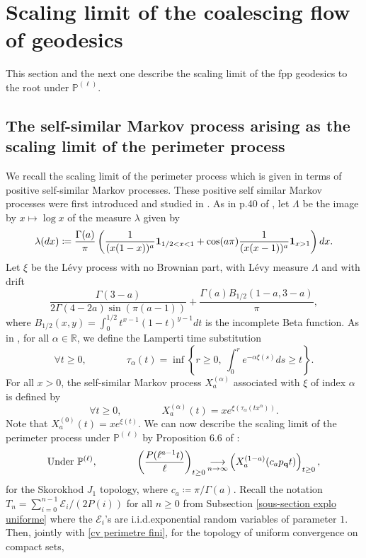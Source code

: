 \documentclass[11pt]{article}
\numberwithin{equation}{section}
\def \R{\mathbb {R}}
\def\P{\mathbb{P}}
\begin{document}
\section{Scaling limit of the coalescing flow of geodesics}\label{section flot}
This section and the next one describe the scaling limit of the fpp geodesics to the root under $\P^{(\ell)}$. 
\subsection{The self-similar Markov process arising as the scaling limit of the perimeter process}\label{sous-section processus autosimilaire}
We recall the scaling limit of the perimeter process which is given in terms of positive self-similar Markov processes. These positive self similar Markov processes were first introduced and studied in \cite{BBCK}. As in p.\@ 40 of \cite{BBCK}, let $\Lambda$ be the image by $x \mapsto \log x$ of the measure {$\lambda$ given by}
$$
\lambda (dx) \coloneqq \frac{\Gamma(a)}{\pi} \left( 
\frac{1}{(x(1-x))^a} {\bf 1}_{1/2 < x < 1} + \cos(a \pi) \frac{1}{(x(x-1))^a} {\bf 1}_{x>1} \right) dx.
$$
Let $\xi$ be the L\'evy process with no Brownian part, with L\'evy measure $\Lambda$ and with drift
\begin{equation}\label{eq drift}
\frac{\Gamma(3-a)}{2\Gamma(4-2a) \sin (\pi (a-1))} + \frac{\Gamma(a)B_{1/2}(1-a, 3-a)}{\pi},
\end{equation}
where $B_{1/2}(x,y) = \int_0^{1/2} t^{x-1} (1-t)^{y-1} dt$ is the incomplete Beta function. As in \cite{BBCK}, for all $\alpha \in \R$, we define the Lamperti time substitution
$$\forall t \ge 0, \qquad \qquad
\tau_\alpha(t) = \inf \left\{ r \ge 0, \ \int_0^r e^{-\alpha \xi(s)} ds \ge t\right\}.$$
For all $x >0$, the self-similar Markov process $X^{(\alpha)}_a$ associated with $\xi$ of index $\alpha$ is defined by
$$
\forall t \ge 0, \qquad \qquad
X^{(\alpha)}_a(t)  = x e^{\xi(\tau_\alpha(t x^\alpha))}.
$$
Note that $X^{(0)}_a(t)  = x e^{\xi(t)}$. We can now describe the scaling limit of the perimeter process under $\P^{(\ell)}$ by Proposition 6.6 of \cite{BBCK}:
\begin{equation}\label{cv perimetre fini}
	\text{Under }\P^{(\ell)}, \qquad \qquad
	\left( \frac{P(\ell^{a-1}t)}{\ell} \right)_{t\ge 0}
	\mathop{\longrightarrow}\limits_{n \to \infty}
	\left(
	X_a^{(1-a)}(c_a p_{\bf q} t)
	\right)_{t\ge 0},
\end{equation} 
for the Skorokhod $J_1$ topology, where $c_a \coloneqq{\pi}/{\Gamma(a) }$. Recall the notation $T_n = \sum_{i=0}^{n-1} {\mathcal{E}_i}/({2P(i)})$ for all $n\ge 0$ from Subsection \ref{sous-section explo uniforme} where the $\mathcal{E}_i$'s are i.i.d.\@ exponential random variables of parameter $1$. Then, jointly with \eqref{cv perimetre fini}, for the topology of uniform convergence on compact sets,
\end{document}
